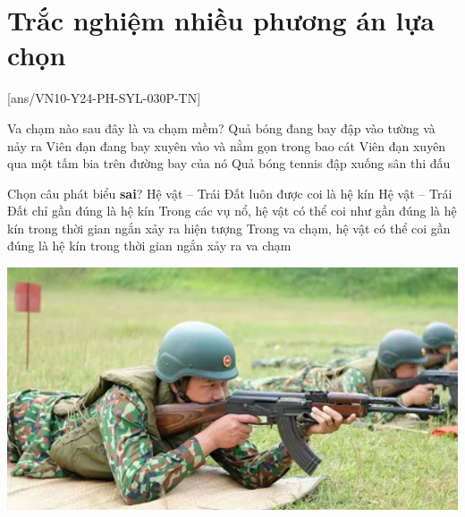 \let\lesson\undefined
\newcommand{\lesson}{\phantomlesson{Bài 19.}}
\setcounter{section}{2}
\section{Trắc nghiệm nhiều phương án lựa chọn}
\setcounter{ex}{0}
[ans/VN10-Y24-PH-SYL-030P-TN]
\begin{ex}
	Va chạm nào sau đây là va chạm mềm?
	\choice
	{Quả bóng đang bay đập vào tường và nảy ra}
	{\True Viên đạn đang bay xuyên vào và nằm gọn trong bao cát}
	{Viên đạn xuyên qua một tấm bia trên đường bay của nó}
	{Quả bóng tennis đập xuống sân thi đấu}
	\loigiai{}
\end{ex}
\begin{ex}
	Chọn câu phát biểu \textbf{sai}?
	\choice
	{\True Hệ vật – Trái Đất luôn được coi là hệ kín}
	{Hệ vật – Trái Đất chỉ gần đúng là hệ kín}
	{Trong các vụ nổ, hệ vật có thể coi như gần đúng là hệ kín trong thời gian ngắn xảy ra hiện tượng}
	{Trong va chạm, hệ vật có thể coi gần đúng là hệ kín trong thời gian ngắn xảy ra va chạm}
	\loigiai{}
\end{ex}
\begin{ex}
	{\includegraphics[scale=0.4]{../figs/VN10-2023-PH-TP030-P-1}}
	\loigiai{}
\end{ex}
